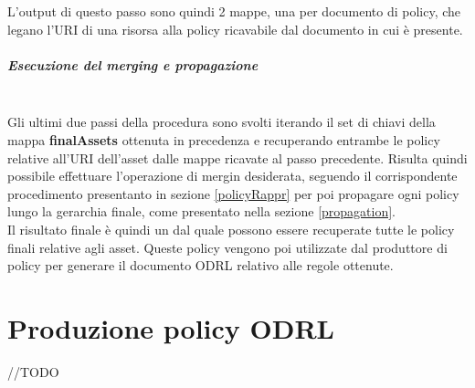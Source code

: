 \documentclass[12pt,a4paper,twoside]{book}
\begin{document}
L'output di questo passo sono quindi 2 mappe, una per documento di policy, che legano l'URI di una risorsa alla policy ricavabile dal documento in cui è presente. 
\subparagraph{Esecuzione del merging e propagazione}\mbox{}\\
Gli ultimi due passi della procedura sono svolti iterando il set di chiavi della mappa \textbf{finalAssets} ottenuta in precedenza e recuperando entrambe le policy relative all'URI dell'asset dalle mappe ricavate al passo precedente. Risulta quindi possibile effettuare l'operazione di mergin desiderata, seguendo il corrispondente procedimento presentanto in sezione \ref{policyRappr} per poi propagare ogni policy lungo la gerarchia finale, come presentato nella sezione \ref{propagation}.\\
Il risultato finale è quindi un  dal quale possono essere recuperate tutte le policy finali relative agli asset. Queste policy vengono poi utilizzate dal produttore di policy per generare il documento ODRL relativo alle regole ottenute.
\section{Produzione policy ODRL}
//TODO
{}

\end{document}
